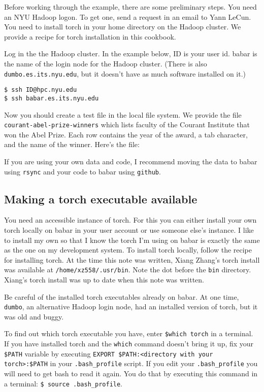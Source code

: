 \documentclass{article}
\let\code\texttt %
\begin{document}
Before working through the example, there are some preliminary steps.
You need an NYU Hadoop logon. To get one, send a request in an email to
Yann LeCun. You need to install torch in your home directory 
on the Hadoop cluster. We provide a recipe for torch
installation in this cookbook.

Log in the the Hadoop cluster. In the example below, ID is your user
id. babar is the name of the login node for the Hadoop cluster.
(There is also \code{dumbo.es.its.nyu.edu}, but it doesn't have as much
software installed on it.)

\begin{verbatim}
$ ssh ID@hpc.nyu.edu
$ ssh babar.es.its.nyu.edu
\end{verbatim}


Now you should create a test file in the local file system. We provide
the file \code{courant-abel-prize-winners} which lists faculty of the
Courant Institute that won the Abel Prize. Each row contains the year of
the award, a tab character, and the name of the winner. Here's the file:



If you are using your own data and code, I recommend moving the data to
babar using \code{rsync} and your code to babar using \code{github}.

\subsection{Making a torch executable available}

You need an accessible instance of torch. For this you can either
install your own torch locally on babar in your user account or use
someone else's instance. I like to install my own so that I know the
torch I'm using on babar is exactly the same as the one on my
development system. To install torch locally, follow the recipe for
installing torch. At the time this note was written, Xiang
Zhang's torch install was available at \code{/home/xz558/.usr/bin}. Note
the dot before the \code{bin} directory. Xiang's torch install was up to
date when this note was written.

Be careful of the installed torch executables already on babar. At one time,
\code{dumbo}, an alternative Hadoop login node, had an installed version
of torch, but it was old and buggy.

To find out which torch executable you have, enter \code{\$which torch} in
a terminal. If you have installed torch and the \code{which} command
doesn't bring it up, fix your \code{\$PATH} variable by executing 
\code{EXPORT \$PATH:<directory with your torch>:\$PATH} in your
\code{.bash\_profile} script. If you edit your \code{.bash\_profile} you
will need to get bash to read it again. You do that by executing this
command in a terminal: \code{\$ source .bash\_profile}.
\end{document}
